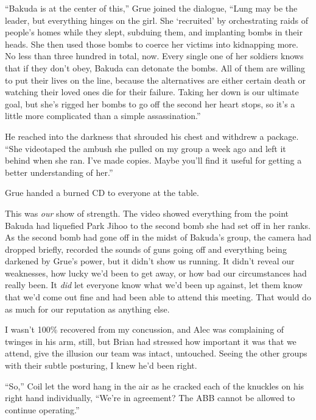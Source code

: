 ``Bakuda is at the center of this,'' Grue joined the dialogue, ``Lung may be the leader, but everything hinges on the girl.  She `recruited' by orchestrating raids of people's homes while they slept, subduing them, and implanting bombs in their heads.  She then used those bombs to coerce her victims into kidnapping more.  No less than three hundred in total, now.  Every single one of her soldiers knows that if they don't obey, Bakuda can detonate the bombs.  All of them are willing to put their lives on the line, because the alternatives are either certain death or watching their loved ones die for their failure.  Taking her down is our ultimate goal, but she's rigged her bombs to go off the second her heart stops, so it's a little more complicated than a simple assassination.''



He reached into the darkness that shrouded his chest and withdrew a package.  ``She videotaped the ambush she pulled on my group a week ago and left it behind when she ran.  I've made copies.  Maybe you'll find it useful for getting a better understanding of her.''



Grue handed a burned CD to everyone at the table.



This was \emph{our} show of strength.  The video showed everything from the point Bakuda had liquefied Park Jihoo to the second bomb she had set off in her ranks.  As the second bomb had gone off in the midst of Bakuda's group, the camera had dropped briefly, recorded the sounds of guns going off and everything being darkened by Grue's power, but it didn't show us running.  It didn't reveal our weaknesses, how lucky we'd been to get away, or how bad our circumstances had really been.  It \emph{did} let everyone know what we'd been up against, let them know that we'd come out fine and had been able to attend this meeting.  That would do as much for our reputation as anything else.



I wasn't 100\% recovered from my concussion, and Alec was complaining of twinges in his arm, still, but Brian had stressed how important it was that we attend, give the illusion our team was intact, untouched. Seeing the other groups with their subtle posturing, I knew he'd been right.



``So,'' Coil let the word hang in the air as he cracked each of the knuckles on his right hand individually, ``We're in agreement?  The ABB cannot be allowed to continue operating.''



